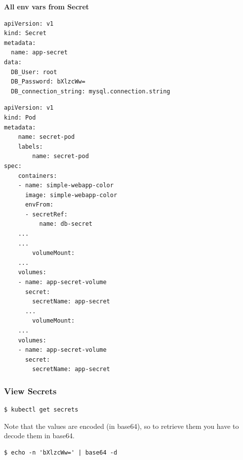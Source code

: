 \documentclass{article}
\newenvironment{blocktemplateIII}[1]{%
    \tcolorbox[beamer,%
    noparskip,breakable,
    ,colframe=Red,%
    colbacklower=LimeGreen!75!LightGreen,%
    title=#1]}%
    {\endtcolorbox}
\newenvironment{codetemplate}[1][]{%
  \mybasecolorbox[#1]
  \itshape
}{%
  \endmybasecolorbox
}
\begin{document}
\textbf{All env vars from Secret}
\begin{codetemplate}{}
\begin{verbatim}
apiVersion: v1
kind: Secret
metadata:
  name: app-secret
data:
  DB_User: root
  DB_Password: bXlzcWw=
  DB_connection_string: mysql.connection.string 
\end{verbatim}
\end{codetemplate}
\begin{codetemplate}{}
\begin{verbatim}
apiVersion: v1
kind: Pod
metadata:
    name: secret-pod
    labels:
        name: secret-pod
spec:
    containers:
    - name: simple-webapp-color
      image: simple-webapp-color
      envFrom:                                                                                                                                            
      - secretRef:                                                                                                                                        
          name: db-secret
    ...
    ...
        volumeMount:
    ...
    volumes:
    - name: app-secret-volume
      secret:
        secretName: app-secret
      ...
        volumeMount:
    ...
    volumes:
    - name: app-secret-volume
      secret:
        secretName: app-secret
\end{verbatim}
\end{codetemplate}

\subsubsection{View Secrets}
\begin{codetemplate}{}
\begin{verbatim}
$ kubectl get secrets
\end{verbatim}
\end{codetemplate}
\begin{blocktemplateIII}{WARNING}
Note that the values are encoded (in base64), so to retrieve them you have to decode them in base64.
\begin{codetemplate}{}
\begin{verbatim}
$ echo -n 'bXlzcWw=' | base64 -d
\end{verbatim}
\end{codetemplate}
\end{blocktemplateIII}
\end{document}
